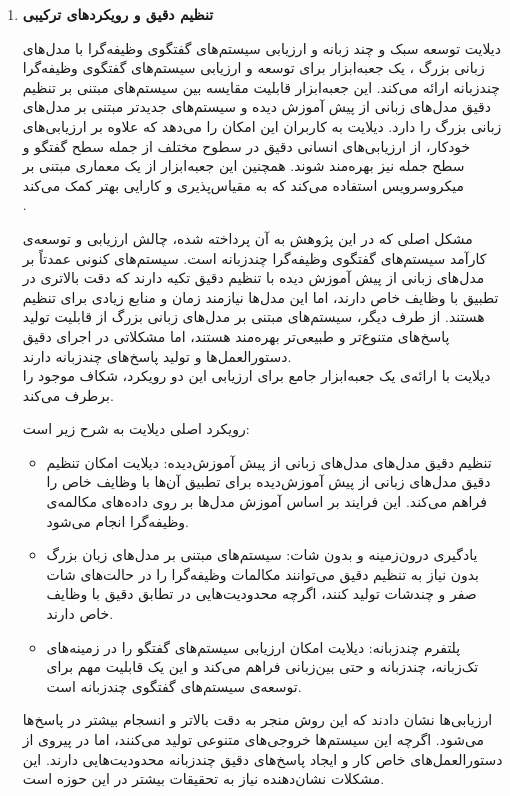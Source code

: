 \begin{enumerate}
\item
\textbf{تنظیم دقیق و رویکردهای ترکیبی}

 
دیلایت%
 توسعه سبک و چند زبانه و ارزیابی سیستم‌های گفتگوی وظیفه‌گرا با مدل‌های زبانی بزرگ%
\cite{hu2024dialight}
، یک 
جعبه‌ابزار%
 برای توسعه و ارزیابی سیستم‌های گفتگوی وظیفه‌گرا چندزبانه ارائه می‌کند. این جعبه‌ابزار قابلیت مقایسه بین سیستم‌های مبتنی بر تنظیم دقیق مدل‌های زبانی از پیش آموزش دیده و سیستم‌های جدیدتر مبتنی بر مدل‌های زبانی بزرگ را دارد. دیلایت به کاربران این امکان را می‌دهد که علاوه بر ارزیابی‌های خودکار، از ارزیابی‌های انسانی دقیق در سطوح مختلف از جمله سطح گفتگو و سطح جمله نیز بهره‌مند شوند. همچنین این جعبه‌ابزار از یک معماری مبتنی بر میکروسرویس استفاده می‌کند که به مقیاس‌پذیری و کارایی بهتر کمک می‌کند 
\cite{hu2024dialight} \\
.

مشکل اصلی که در این پژوهش به آن پرداخته شده، چالش ارزیابی و توسعه‌ی کارآمد سیستم‌های گفتگوی وظیفه‌گرا چندزبانه است. سیستم‌های کنونی عمدتاً بر مدل‌های زبانی از پیش آموزش دیده با تنظیم دقیق تکیه دارند که دقت بالاتری در تطبیق با وظایف خاص دارند، اما این مدل‌ها نیازمند زمان و منابع زیادی برای تنظیم هستند. از طرف دیگر، سیستم‌های مبتنی بر مدل‌های زبانی بزرگ از قابلیت تولید پاسخ‌های متنوع‌تر و طبیعی‌تر بهره‌مند هستند، اما مشکلاتی در اجرای دقیق دستورالعمل‌ها و تولید پاسخ‌های چندزبانه دارند.
\cite{hu2024dialight} \\
 دیلایت با ارائه‌ی یک جعبه‌ابزار جامع برای ارزیابی این دو رویکرد، شکاف موجود را برطرف می‌کند.

رویکرد اصلی دیلایت به شرح زیر است:
\begin{itemize}
\item
تنظیم دقیق مدل‌های مدل‌های زبانی از پیش آموزش‌دیده: دیلایت امکان تنظیم دقیق مدل‌های زبانی از پیش آموزش‌دیده برای تطبیق آن‌ها با وظایف خاص را فراهم می‌کند. این فرایند بر اساس آموزش مدل‌ها بر روی داده‌های مکالمه‌ی وظیفه‌گرا انجام می‌شود.
\item
یادگیری درون‌زمینه%
 و بدون شات: سیستم‌های مبتنی بر مدل‌های زبان بزرگ بدون نیاز به تنظیم دقیق می‌توانند مکالمات وظیفه‌گرا را در حالت‌های شات صفر و چندشات تولید کنند، اگرچه محدودیت‌هایی در تطابق دقیق با وظایف خاص دارند.
\item
پلتفرم چندزبانه: دیلایت امکان ارزیابی سیستم‌های گفتگو را در زمینه‌های تک‌زبانه، چندزبانه و حتی بین‌زبانی فراهم می‌کند و این یک قابلیت مهم برای توسعه‌ی سیستم‌های گفتگوی چندزبانه است.
\end{itemize}

ارزیابی‌ها نشان دادند که این روش منجر به دقت بالاتر و انسجام بیشتر در پاسخ‌ها می‌شود. 
اگرچه این سیستم‌ها خروجی‌های متنوعی تولید می‌کنند، اما در پیروی از دستورالعمل‌های خاص کار و ایجاد پاسخ‌های دقیق چندزبانه محدودیت‌هایی دارند. این مشکلات نشان‌دهنده نیاز به تحقیقات بیشتر در این حوزه است.


\end{enumerate}
